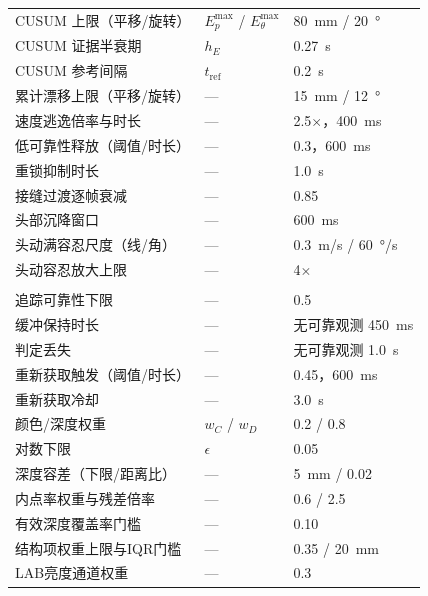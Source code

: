 \documentclass[review]{vgtc}
\begin{document}
\begin{table}[t]
\begin{tabularx}{\columnwidth}{@{}>{\raggedright\arraybackslash}Xll@{}}
CUSUM 上限（平移/旋转） & $E_p^{\max}$ / $E_\theta^{\max}$ & 80~mm / 20~° \\
CUSUM 证据半衰期 & $h_E$ & 0.27~s \\
CUSUM 参考间隔 & $t_{\mathrm{ref}}$ & 0.2~s \\
累计漂移上限（平移/旋转） & --- & 15~mm / 12~° \\
速度逃逸倍率与时长 & --- & 2.5$\times$，400~ms \\
低可靠性释放（阈值/时长） & --- & 0.3，600~ms \\
重锁抑制时长 & --- & 1.0~s \\
接缝过渡逐帧衰减 & --- & 0.85 \\
头部沉降窗口 & --- & 600~ms \\
头动满容忍尺度（线/角） & --- & 0.3~m/s / 60~°/s \\
头动容忍放大上限 & --- & 4$\times$ \\
\midrule
\multicolumn{3}{@{}l}{\emph{有效性与 VCD 评分}} \\
追踪可靠性下限 & --- & 0.5 \\
缓冲保持时长 & --- & 无可靠观测 450~ms \\
判定丢失 & --- & 无可靠观测 1.0~s \\
重新获取触发（阈值/时长） & --- & 0.45，600~ms \\
重新获取冷却 & --- & 3.0~s \\
颜色/深度权重 & $w_C$ / $w_D$ & 0.2 / 0.8 \\
对数下限 & $\epsilon$ & 0.05 \\
深度容差（下限/距离比） & --- & 5~mm / 0.02 \\
内点率权重与残差倍率 & --- & 0.6 / 2.5 \\
有效深度覆盖率门槛 & --- & 0.10 \\
结构项权重上限与IQR门槛 & --- & 0.35 / 20~mm \\
LAB亮度通道权重 & --- & 0.3 \\
\bottomrule
\end{tabularx}
\end{table}
\end{document}
